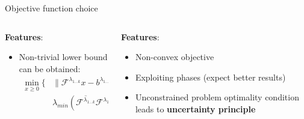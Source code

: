 \documentclass[../main.tex]{subfiles}
\begin{document}
\begin{frame}[t]{Objective function choice}
\begin{columns}[t]
\begin{column}{0.5\textwidth}
    \textbf{Features}:
    \begin{itemize}
        \item Non-trivial lower bound can be obtained:
            \begin{equation*}
            \begin{split}
            \min_{x \ge 0} \Big\{ &\| \mathcal{F}^{\lambda_{1 \ldots k}}x - b^{\lambda_{1 \ldots k}} \|_2^2 + \\ 
            & \lambda_{min} (\overline{\mathcal{F}^{\lambda_{1 \ldots k}}}\mathcal{F}^{\lambda_{1 \ldots k}}) x^T B x \Big\} \\
            \end{split}
            \end{equation*}
    \end{itemize}
    
\end{column}
\begin{column}{0.5\textwidth}
    \textbf{Features}:
    \begin{itemize}
        \item Non-convex objective
        \item Exploiting phases (expect better results)
        \item Unconstrained problem optimality condition leads to \textbf{uncertainty principle} 
    \end{itemize}
\end{column}    
\end{columns}


\end{frame}





%
%
\end{document}
